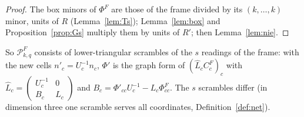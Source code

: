 \documentclass[11pt]{amsart}
\theoremstyle{definition}
\theoremstyle{plain}
\begin{document}
\begin{proof}
The box minors of $\Phi^F$ are those of the frame divided by its $(k,\dots,k)$ minor, units of $R$ (Lemma~\ref{lem:Ts}); Lemma~\ref{lem:box} and Proposition~\ref{prop:Gs} multiply them by units of $R'$; then Lemma~\ref{lem:nie}.
\end{proof}

So $\mathcal P^F_{k,q}$ consists of lower-triangular scrambles of the $s$ readings of the frame: with the new cells $n'_c=U_c^{-1}n_c$, $\Phi'$ is the graph form of $(\hat L_cC^F_c)_c$ with $\hat L_c=\left(\begin{smallmatrix}U_c^{-1}&0\\ B_c&L_c\end{smallmatrix}\right)$ and $B_c=\Phi'_{cc}U_c^{-1}-L_c\Phi^F_{cc}$. The $s$ scrambles differ (in dimension three one scramble serves all coordinates, Definition~\ref{def:net}).
\end{document}
